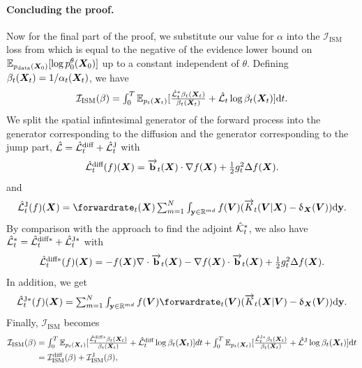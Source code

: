 \paragraph{Concluding the proof.} Now for the final part of the proof, we
substitute our value for $\alpha$ into the $\mathcal{I}_{\text{ISM}}$ loss from
\citet{benton2022denoising} which is equal to the negative of the evidence lower
bound on $\mathbb{E}_{p_{\rm{data}}({\bm{X}}_0)} [ \log p_0^\theta({\bm{X}}_0) ]$ up to
a constant independent of $\theta$. Defining
$\beta_t({\bm{X}}_t) = 1 / \alpha_t({\bm{X}}_t)$, we have
\begin{equation}
  \textstyle 
    \mathcal{I}_{\text{ISM}} (\beta) = \int_{0}^T \mathbb{E}_{p_t({\bm{X}}_t)} [ \frac{\hat{\mathcal{L}}_t^* \beta_t({\bm{X}}_t)}{\beta_t({\bm{X}}_t)} + \hat{\mathcal{L}}_t \log \beta_t({\bm{X}}_t) ] \mathrm{d} t . 
\end{equation}
 We split the spatial infintesimal generator of the forward process into the generator corresponding to the diffusion and the generator corresponding to the jump part, $\hat{\mathcal{L}} = \hat{\mathcal{L}}^{\text{diff}}_t + \hat{\mathcal{L}}^{\text{J}}_t$ with
 \begin{equation}
    \textstyle  \hat{\mathcal{L}}^{\text{diff}}_t(f)({\bm{X}}) = \overrightarrow{\mathbf{b}}_t({\bm{X}}) \cdot \nabla f({\bm{X}}) + \frac{1}{2} g_t^2 \Delta f({\bm{X}}) . 
 \end{equation}
 and 
 \begin{equation}
   \textstyle \LJ_t(f)(\mX) = \forwardrate_t(\mX) \inty f(\mV) ( \ftk_t(\mV | \mX) - \updelta_{\mX}(\mV) ) \rmd \y . 
 \end{equation}
 By comparison with the approach to find the adjoint $\hat{\mathcal{K}}^*_t$, we also have
 $\hat{\mathcal{L}}_t^* = \hat{\mathcal{L}}_t^{\text{diff}*} + \hat{\mathcal{L}}^{\text{J}* }_t$ with
 \begin{equation}
\textstyle     \hat{\mathcal{L}}_t^{\text{diff}*}(f)({\bm{X}}) = -f({\bm{X}}) \nabla \cdot \overrightarrow{\mathbf{b}}_t({\bm{X}}) - \nabla f({\bm{X}}) \cdot \overrightarrow{\mathbf{b}}_t({\bm{X}}) + \frac{1}{2} g_t^2 \Delta f({\bm{X}}) .
   \end{equation}
In addition, we get 
 \begin{equation}
     \textstyle \aLJ_t(f)(\mX) = \inty f(\mV) \forwardrate_t(\mV) ( \ftk_t(\mX | \mV) - \updelta_{\mX}(\mV) ) \rmd \y .
 \end{equation}
Finally, $\mathcal{I}_{\text{ISM}}$ becomes
\begin{align}
    \mathcal{I}_{\text{ISM}} (\beta) &\textstyle = \int_{0}^T \mathbb{E}_{p_t({\bm{X}}_t)} [ \frac{\hat{\mathcal{L}}_t^{\text{diff}*} \beta_t({\bm{X}}_t)}{\beta_t({\bm{X}}_t)} + \hat{\mathcal{L}}^{\text{diff}}_t \log \beta_t({\bm{X}}_t) ] dt + 
    \int_{0}^T \mathbb{E}_{p_t({\bm{X}}_t)} [ \frac{\hat{\mathcal{L}}^{\text{J}* }_t \beta_t({\bm{X}}_t)}{\beta_t({\bm{X}}_t)} + \hat{\mathcal{L}}^{\text{J}} \log \beta_t({\bm{X}}_t) ] \mathrm{d} t \\
    &\textstyle = \mathcal{I}_{\text{ISM}}^{\text{diff}}(\beta) + \mathcal{I}_{\text{ISM}}^{\text{J}}(\beta) , 
\end{align}
